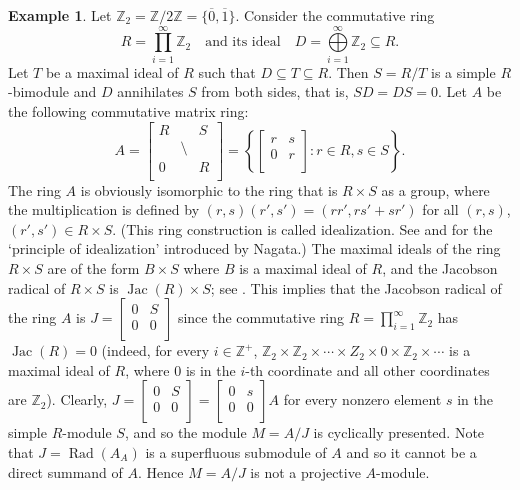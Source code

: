 \documentclass[11pt,a4paper]{amsart}
\theoremstyle{plain}
\theoremstyle{definition}
\newtheorem{example}[theorem]{Example}
\theoremstyle{remark}
\newcommand{\Z}{{\mathbb{Z}}}
\newcommand{\Rad}{\operatorname{Rad}}
\newcommand{\Jac}{\operatorname{Jac}}
\begin{document}
\begin{example} \label{Ex:Cyclically_presented_module}
Let $\Z_{2}=\Z/2\Z=\{\overline{0},\overline{1}\}$. Consider the commutative ring
\[R=\prod \limits_{i=1}^{\infty}\Z_{2}\quad \mbox{and its ideal}\quad D= \bigoplus \limits_{i=1}^{\infty}\Z_{2}\subseteq R.\] Let $T$ be a maximal ideal of $R$ such that $D\subseteq T \subseteq R$. Then $S=R/T$ is a simple $R$-bimodule and $D$ annihilates $S$ from both sides, that is, $SD=DS=0$. Let $A$ be the following commutative matrix ring: 
\[A=\left[\begin{array}{lll}                                                R & &S \\                                            &\setminus &  \\
                      0 & & R\\
                    \end{array}\right]= \left\{\left[\begin{array}{ll}
                       r & s\\
                        0 & r \\
                       \end{array}\right]
               : r\in R, s\in S \right\}.\]
The ring $A$ is obviously isomorphic to the ring that is $R \times S$ as a group, where the multiplication is defined by
$(r,s)(r',s')=(rr', rs'+sr')$ for all $(r,s)$, $(r',s')\in R\times S$. (This ring construction is called idealization. See \cite[\S 1]{Nagata:LocalRings1962} and \cite{Anderson-and-Winders:IdealizationOfAModule} for the `principle of idealization' introduced by Nagata.) The maximal ideals of the ring $R\times S$ are of the form $B \times S$ where $B$ is a maximal ideal of $R$, and the Jacobson radical of $ R\times S  $ is $ \Jac(R)\times S $; see  \cite[Theorem 3.2-(1)]{Anderson-and-Winders:IdealizationOfAModule}. This implies that the Jacobson radical of the ring $A$ is
$
{J} =
\left[
\begin{array}{ll}
0 &S \\
0 & 0 \\
\end{array}
\right]
$
since the commutative ring $R=\prod \limits_{i=1}^{\infty}\Z_{2}$ has $\Jac(R)=0$ (indeed, for every $i\in \Z^{+}$, $\Z_{2}\times \Z_{2}\times \cdots\times Z_{2}\times 0 \times \Z_2 \times \cdots$ is a maximal ideal of $R$, where $0$ is in the $i$-th coordinate and all other coordinates are $\Z_2$). Clearly,
$  {J}=  \left[\begin{array}{ll}
0 & S\\
0 & 0 \\
\end{array}\right]
=
\left[\begin{array}{ll}
0 & s\\
0 & 0 \\
\end{array}\right] A $ for every nonzero element $ s   $ in the simple $R$-module $S$, and so the module $M=A/J$ is cyclically presented. Note that ${J}=\Rad(A_A)$ is a superfluous submodule of $A$ and so it cannot be a direct summand of $A$. Hence $M=A/{J}$ is not a projective $A$-module.


\end{example}
\end{document}
